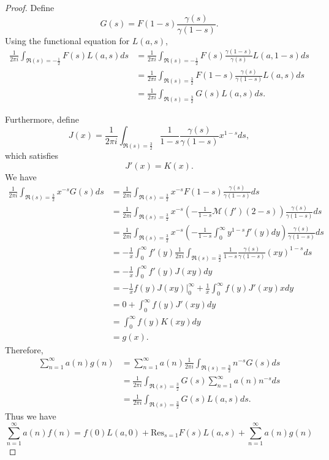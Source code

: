 \documentclass{article}
\newcommand{\Res}{\mathrm{Res}}
\begin{document}
\begin{proof}
Define
\[
G(s)=F(1-s) \frac{\gamma(s)}{\gamma(1-s)}.
\]
Using the functional equation for $L(a,s)$,
\begin{align*}
 \frac{1}{2\pi i} \int_{\Re(s)=-\frac{1}{2}} F(s)L(a,s) ds&=
  \frac{1}{2\pi i} \int_{\Re(s)=-\frac{1}{2}} F(s)\frac{\gamma(1-s)}{\gamma(s)} L(a,1-s) ds\\
 &=\frac{1}{2\pi i}  \int_{\Re(s)=\frac{3}{2}} F(1-s) \frac{\gamma(s)}{\gamma(1-s)}
 L(a,s) ds\\
 &=\frac{1}{2\pi i} \int_{\Re(s)=\frac{3}{2}} G(s) L(a,s) ds.
\end{align*}

Furthermore, define
\[
J(x) = \frac{1}{2\pi i} \int_{\Re(s)=\frac{3}{2}} \frac{1}{1-s} \frac{\gamma(s)}{\gamma(1-s)} x^{1-s} ds,
\]
which satisfies
\[
J'(x) = K(x).
\]
We have
\begin{align*}
\frac{1}{2\pi i} \int_{\Re(s)=\frac{3}{2}} x^{-s} G(s) ds&=\frac{1}{2\pi i} \int_{\Re(s)=\frac{3}{2}} x^{-s} F(1-s) \frac{\gamma(s)}{\gamma(1-s)} ds\\
&=\frac{1}{2\pi i} \int_{\Re(s)=\frac{3}{2}} x^{-s} \left(-\frac{1}{1-s} \mathscr{M}(f')(2-s)\right) \frac{\gamma(s)}{\gamma(1-s)} ds\\
&=\frac{1}{2\pi i} \int_{\Re(s)=\frac{3}{2}} x^{-s} 
\left(-\frac{1}{1-s} \int_0^\infty y^{1-s} f'(y) dy\right)  \frac{\gamma(s)}{\gamma(1-s)}  ds\\
&=-\frac{1}{x} \int_0^\infty f'(y)   \frac{1}{2\pi i} \int_{\Re(s)=\frac{3}{2}} \frac{1}{1-s}  \frac{\gamma(s)}{\gamma(1-s)}   (xy)^{1-s} ds\\
&=-\frac{1}{x} \int_0^\infty f'(y) J(xy) dy\\
&=-\frac{1}{x}f(y) J(xy) \bigg|_0^\infty + \frac{1}{x} \int_0^\infty f(y) J'(xy) x dy\\
&=0+\int_0^\infty f(y) J'(xy) dy\\
&=\int_0^\infty f(y) K(xy) dy\\
&=g(x).
\end{align*}
Therefore,
\begin{align*}
\sum_{n=1}^\infty a(n) g(n)&=\sum_{n=1}^\infty a(n) \frac{1}{2\pi i} \int_{\Re(s)=\frac{3}{2}} n^{-s} G(s) ds\\
&=\frac{1}{2\pi i} \int_{\Re (s)=\frac{3}{2}} G(s) \sum_{n=1}^\infty a(n) n^{-s} ds\\
&=\frac{1}{2\pi i} \int_{\Re(s)=\frac{3}{2}} G(s) L(a,s) ds.
\end{align*}
Thus we have
\[
\sum_{n=1}^\infty a(n) f(n)=f(0)L(a,0)+\Res_{s=1} F(s)L(a,s)
+ \sum_{n=1}^\infty a(n) g(n)
\]
\end{proof}
\end{document}
